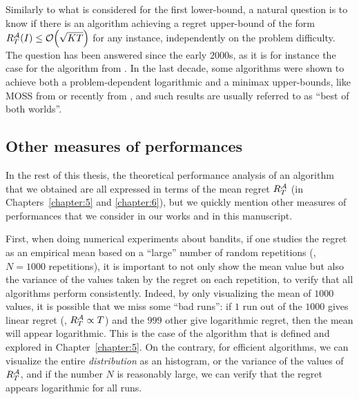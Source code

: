 Similarly to what is considered for the first lower-bound,
a natural question is to know if there is an algorithm achieving a regret upper-bound of the form $R_T^{\mathcal{A}}(I) \leq \mathop{}\mathopen{}\mathcal{O}\mathopen{}\left(\sqrt{K T}\right)$ for any instance, independently on the problem difficulty.
The question has been answered since the early $2000$s, as it is for instance the case for the \ExpThree{} algorithm from \cite{Auer02}.
In the last decade, some algorithms were shown to achieve both a problem-dependent logarithmic and a minimax upper-bounds,
like MOSS from \cite{Audibert2009minimax} or recently \KLUCBpp{} from \cite{Menard17},
and such results are usually referred to as ``best of both worlds''.





\subsection{Other measures of performances}
\label{sub:2:otherMeasuresPerformance}

In the rest of this thesis, the theoretical performance analysis of an algorithm that we obtained are all expressed in terms of the mean regret $R_T^{\mathcal{A}}$ (in Chapters~\ref{chapter:5} and \ref{chapter:6}), but we quickly mention other measures of performances that we consider in our works and in this manuscript.

First, when doing numerical experiments about bandits, if one studies the regret as an empirical mean based on a ``large'' number of random repetitions (\eg, $N=1000$ repetitions), it is important to not only show the mean value but also the variance of the values taken by the regret on each repetition, to verify that all algorithms perform consistently.
Indeed, by only visualizing the mean of $1000$ values, it is possible that we miss some ``bad runs'': if $1$ run out of the $1000$ gives linear regret (\ie, $R_T^{\mathcal{A}} \propto T$) and the $999$ other give logarithmic regret, then the mean will appear logarithmic.
This is the case of the \Selfish{} algorithm that is defined and explored in Chapter~\ref{chapter:5}.
On the contrary, for efficient algorithms,
we can visualize the entire \emph{distribution} as an histogram, or the variance of the values of $R_T^{\mathcal{A}}$, and if the number $N$ is reasonably large, we can verify that the regret appears logarithmic for all runs.

